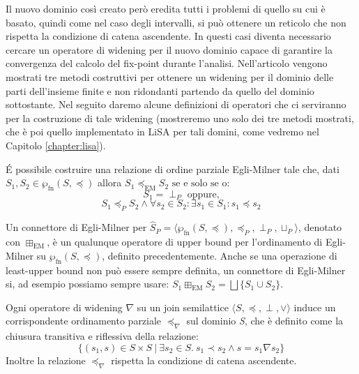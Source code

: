 Il nuovo dominio così creato però eredita tutti i problemi di quello su cui è basato, quindi come nel caso degli intervalli, si può ottenere un reticolo che non rispetta la condizione di catena ascendente. In questi casi diventa necessario cercare un operatore di widening per il nuovo dominio capace di garantire la convergenza del calcolo del fix-point durante l'analisi. Nell'articolo \cite{DBLP:journals/sttt/BagnaraHZ07} vengono mostrati tre metodi costruttivi per ottenere un widening per il dominio delle parti dell'insieme finite e non ridondanti partendo da quello del dominio sottostante. Nel seguito daremo alcune definizioni di operatori che ci serviranno per la costruzione di tale widening (mostreremo uno solo dei tre metodi mostrati, che è poi quello implementato in LiSA per tali domini, come vedremo nel Capitolo \ref{chapter:lisa}).

\begin{definition} \label{def:EgliMilnerRelation}
\'E possibile costruire una relazione di ordine parziale Egli-Milner tale che, dati \(S_1, S_2\in\wp_{\textrm{fn}}(S, \preceq)\) allora \(S_1 \preceq_{\textrm{EM}} S_2 \textrm{ se e solo se o:} \)
\[S_1=\perp_P\textrm{ oppure,}\]
\[S_1\preceq_P S_2 \wedge \forall s_2\in S_2 : \exists s_1\in S_1: s_1\preceq s_2\]
\end{definition}

\begin{definition}\label{def:connettoreEgliMilner}
Un connettore di Egli-Milner per \(\hat{S}_P = \langle \wp_{\textrm{fn}}(S, \preceq),\preceq_P, \perp_P ,\sqcup_P\rangle\), denotato con \(\boxplus_{\textrm{EM}}\), è un qualunque operatore di upper bound per l'ordinamento di Egli-Milner su \(\wp_{\textrm{fn}}(S, \preceq)\), definito precedentemente. Anche se una operazione di least-upper bound non può essere sempre definita, un connettore di Egli-Milner si, ad esempio possiamo sempre usare: \(S_1\boxplus_{\textrm{EM}} S_2 = \bigsqcup\{ S_1 \cup S_2\}\).
\end{definition}

\begin{definition} 
Ogni operatore di widening \(\nabla\) su un join semilattice \(\langle S,\preceq, \perp ,\vee\rangle\) induce un corrispondente ordinamento parziale \(\preceq_{\nabla}\) sul dominio \emph{S}, che è definito come la chiusura transitiva e riflessiva della relazione:
\[\lbrace(s_1, s)\in S\times S\ \vert\ \exists s_2\in S.\ s_1\prec s_2 \wedge s = s_1\nabla s_2\rbrace\]
Inoltre la relazione \(\preceq_{\nabla}\) rispetta la condizione di catena ascendente.
\end{definition}

